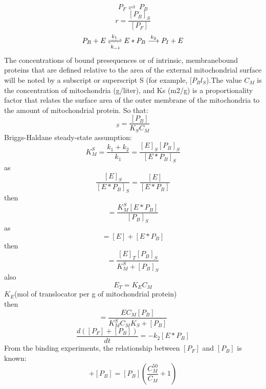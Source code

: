 \documentclass[UTF8]{ctexart}%
\begin{document}
\begin{displaymath}
P_F\rightleftharpoons\ P_B
\end{displaymath}
\begin{displaymath}
r=\frac{[P_B]_S}{[P_F]}
\end{displaymath}
\begin{displaymath}
P_B+E \xrightleftharpoons[k_{-1}]{k_1}  E * P_B \stackrel{k_2}{\longrightarrow} P_I+E
\end{displaymath}
The concentrations of bound presequences or of intrinsic, membranebound proteins that are defined relative to the area of the external mitochondrial surface will be noted by a subscript or superscript S (for example, $[P_Bl_S$).The value $C_M$ is the concentration of mitochondria (g/liter), and Ks (m2/g) is a proportionality factor that relates the surface area of the outer membrane of the mitochondria to the amount of mitochondrial protein. So that:
\begin{equation}
[P_B]_S=\frac{[P_B]}{K_S C_M}
\end{equation}
Briggs-Haldane steady-state assumption:
\begin{equation}
K_M^S=\frac{k_1+k_2}{k_1}=\frac{[E]_S [P_B]_S}{[E*P_B]_S}
\end{equation}
as
\begin{equation}
\frac{[E]_S}{[E*P_B]_S}=\frac{[E]}{[E*P_B]}
\end{equation}
then
\begin{equation}
[E]=\frac{K_M^S[E*P_B]}{[P_B]_S}
\end{equation}
as
\begin{equation}
[E_T]=[E]+[E*P_B]
\end{equation}
then
\begin{equation}
[E*P_B]=\frac{[E]_T[P_B]_S}{K_M^S+[P_B]_S}
\end{equation}
also
\begin{equation}
E_T=K_EC_M
\end{equation}
$K_E$(mol of translocator per g of mitochondrial protein) \\
then
\begin{equation}
[E*P_B]=\frac{EC_M[P_B]}{K_M^SC_MK_S+[P_B]}
\end{equation}
\begin{equation}
\frac{d([P_F]+[P_B])}{d t}=-k_2[E*P_B]
\end{equation}
From the binding experiments, the relationship between $[P_F]$ and $[P_B]$ is known:
\begin{equation}
[P_F]+[P_B]=[P_B](\frac{C_M^{50}}{C_M}+1)
\end{equation}
\end{document}
